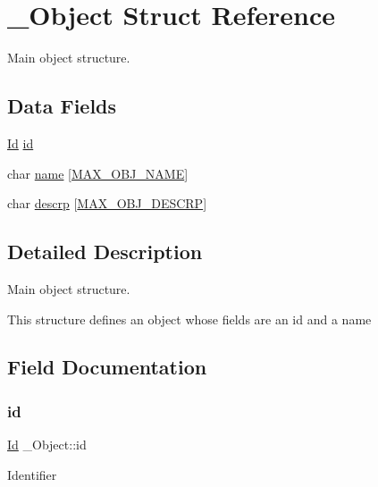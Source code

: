 \hypertarget{struct__Object}{}\section{\+\_\+\+Object Struct Reference}
\label{struct__Object}


Main object structure.  


\subsection*{Data Fields}
\begin{DoxyCompactItemize}
\item 
\hyperlink{types_8h_a845e604fb28f7e3d97549da3448149d3}{Id} \hyperlink{struct__Object_a3cff7a0e8dc4e9d23895ed9af1b7653a}{id}
\item 
char \hyperlink{struct__Object_a59556463a256cec309077768589f10a8}{name} \mbox{[}\hyperlink{object_8h_a6a2f391825e94d06a3137b75abfa1bba}{M\+A\+X\+\_\+\+O\+B\+J\+\_\+\+N\+A\+ME}\mbox{]}
\item 
char \hyperlink{struct__Object_affa493ad8fdeafe924950f7388356a55}{descrp} \mbox{[}\hyperlink{object_8h_a9c396da2f3b9f0191120ff1666af6381}{M\+A\+X\+\_\+\+O\+B\+J\+\_\+\+D\+E\+S\+C\+RP}\mbox{]}
\end{DoxyCompactItemize}


\subsection{Detailed Description}
Main object structure. 

This structure defines an object whose fields are an id and a name 

\subsection{Field Documentation}
\mbox{\label{struct__Object_a3cff7a0e8dc4e9d23895ed9af1b7653a}} 
\subsubsection{\texorpdfstring{id}{id}}
{\footnotesize\ttfamily \hyperlink{types_8h_a845e604fb28f7e3d97549da3448149d3}{Id} \+\_\+\+Object\+::id}

Identifier \mbox{\label{struct__Object_a59556463a256cec309077768589f10a8}} 
